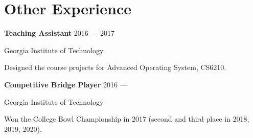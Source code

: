 \section{Other Experience}


\parbox[t][][t]{\linewidth}{
	\parbox{\linewidth}{\textbf{Teaching Assistant} \hfill {{2016 --- 2017}}}
	\parbox{\linewidth}{Georgia Institute of Technology}
	\smallbreak
	\smallskip
  Designed the course projects for Advanced Operating System, CS6210.
	\bigbreak
	\smallskip
}

\parbox[t][][t]{\linewidth}{
	\parbox{\linewidth}{\textbf{Competitive Bridge Player} \hfill {{2016 --- }}}
	\parbox{\linewidth}{Georgia Institute of Technology}
	\smallbreak
	\smallskip
  Won the College Bowl Championship in 2017 (second and third place in 2018, 2019, 2020).
	\smallbreak
	\smallskip
}


